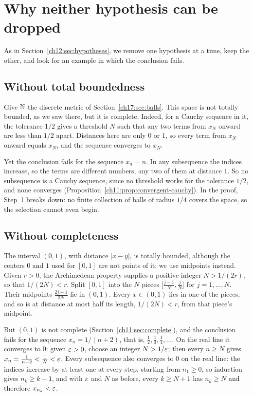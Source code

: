 \section{Why neither hypothesis can be dropped}\label{ch17:sec:counterexamples}
As in Section~\ref{ch12:sec:hypotheses}, we remove one hypothesis at a time, keep the other, and look for an example in which the conclusion fails.

\subsection*{Without total boundedness}
Give $\mathbb N$ the discrete metric of Section~\ref{ch17:sec:balls}. This space is not totally bounded, as we saw there, but it is complete. Indeed, for a Cauchy sequence in it, the tolerance $1/2$ gives a threshold $N$ such that any two terms from $x_N$ onward are less than $1/2$ apart. Distances here are only $0$ or $1$, so every term from $x_N$ onward equals $x_N$, and the sequence converges to $x_N$.

Yet the conclusion fails for the sequence $x_n=n$. In any subsequence the indices increase, so the terms are different numbers, any two of them at distance $1$. So no subsequence is a Cauchy sequence, since no threshold works for the tolerance $1/2$, and none converges (Proposition~\ref{ch11:prop:convergent-cauchy}). In the proof, Step~1 breaks down: no finite collection of balls of radius $1/4$ covers the space, so the selection cannot even begin.

\subsection*{Without completeness}
The interval $(0,1)$, with distance $|x-y|$, is totally bounded, although the centers $0$ and $1$ used for $[0,1]$ are not points of it; we use midpoints instead. Given $r>0$, the Archimedean property supplies a positive integer $N>1/(2r)$, so that $1/(2N)<r$. Split $[0,1]$ into the $N$ pieces $\bigl[\tfrac{j-1}N,\tfrac jN\bigr]$ for $j=1,\ldots,N$. Their midpoints $\tfrac{2j-1}{2N}$ lie in $(0,1)$. Every $x\in(0,1)$ lies in one of the pieces, and so is at distance at most half its length, $1/(2N)<r$, from that piece's midpoint.

But $(0,1)$ is not complete (Section~\ref{ch11:sec:complete}), and the conclusion fails for the sequence $x_n=1/(n+2)$, that is, $\tfrac12,\tfrac13,\tfrac14,\ldots$. On the real line it converges to $0$: given $\varepsilon>0$, choose an integer $N>1/\varepsilon$; then every $n\ge N$ gives $x_n=\tfrac1{n+2}<\tfrac1N<\varepsilon$. Every subsequence also converges to $0$ on the real line: the indices increase by at least one at every step, starting from $n_1\ge0$, so induction gives $n_k\ge k-1$, and with $\varepsilon$ and $N$ as before, every $k\ge N+1$ has $n_k\ge N$ and therefore $x_{n_k}<\varepsilon$.

